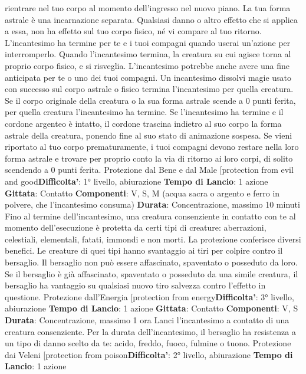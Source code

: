 \begin{multicols}{2}
rientrare nel tuo corpo al momento dell’ingresso nel
nuovo piano. La tua forma astrale è una incarnazione
separata. Qualsiasi danno o altro effetto che si applica
a essa, non ha effetto sul tuo corpo fisico, né vi
compare al tuo ritorno.
L’incantesimo ha termine per te e i tuoi compagni
quando userai un’azione per interromperlo. Quando
l’incantesimo termina, la creatura su cui agisce torna al
proprio corpo fisico, e si risveglia.
L’incantesimo potrebbe anche avere una fine anticipata
per te o uno dei tuoi compagni. Un incantesimo dissolvi
magie usato con successo sul corpo astrale o fisico
termina l’incantesimo per quella creatura. Se il corpo
originale della creatura o la sua forma astrale scende a
0 punti ferita, per quella creatura l’incantesimo ha
termine. Se l’incantesimo ha termine e il cordone
argenteo è intatto, il cordone trascina indietro al suo
corpo la forma astrale della creatura, ponendo fine al
suo stato di animazione sospesa.
Se vieni riportato al tuo corpo prematuramente, i tuoi
compagni devono restare nella loro forma astrale e
trovare per proprio conto la via di ritorno ai loro corpi, di
solito scendendo a 0 punti ferita.
Protezione dal Bene e dal Male
[protection from evil and good\textbf{Difficolta'}:
1° livello, abiurazione
\textbf{Tempo di Lancio}: 1 azione
\textbf{Gittata}: Contatto
\textbf{Componenti}: V, S, M (acqua sacra o argento e ferro in
polvere, che l’incantesimo consuma)
\textbf{Durata}: Concentrazione, massimo 10 minuti
Fino al termine dell’incantesimo, una creatura
consenziente in contatto con te al momento
dell’esecuzione è protetta da certi tipi di creature:
aberrazioni, celestiali, elementali, fatati, immondi e non
morti.
La protezione conferisce diversi benefici. Le creature di
quei tipi hanno svantaggio ai tiri per colpire contro il
bersaglio. Il bersaglio non può essere affascinato,
spaventato o posseduto da loro. Se il bersaglio è già
affascinato, spaventato o posseduto da una simile
creatura, il bersaglio ha vantaggio su qualsiasi nuovo
tiro salvezza contro l’effetto in questione.
Protezione dall’Energia
[protection from energy\textbf{Difficolta'}:
3° livello, abiurazione
\textbf{Tempo di Lancio}: 1 azione
\textbf{Gittata}: Contatto
\textbf{Componenti}: V, S
\textbf{Durata}: Concentrazione, massimo 1 ora
Lanci l’incantesimo a contatto di una creatura
consenziente. Per la durata dell’incantesimo, il
bersaglio ha resistenza a un tipo di danno scelto da te:
acido, freddo, fuoco, fulmine o tuono.
Protezione dai Veleni
[protection from poison\textbf{Difficolta'}:
2° livello, abiurazione
\textbf{Tempo di Lancio}: 1 azione

\end{multicols}
